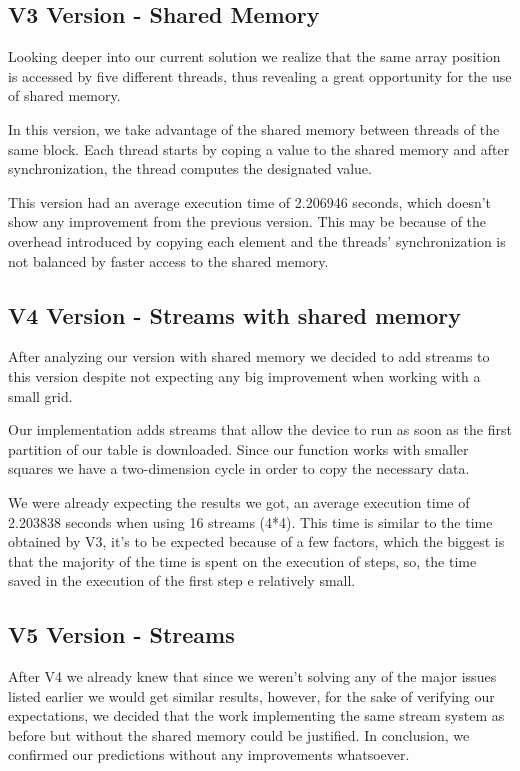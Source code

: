 \documentclass[conference]{IEEEtran}
\begin{document}


\subsection{V3 Version - Shared Memory}
Looking deeper into our current solution we realize that the same array position is accessed by five different threads, thus revealing a great opportunity for the use of shared memory.

In this version, we take advantage of the shared memory between threads of the same block. Each thread starts by coping a value to the shared memory and after synchronization, the thread computes the designated value.

This version had an average execution time of 2.206946 seconds, which doesn't show any improvement from the previous version. This may be because of the overhead introduced by copying each element and the threads' synchronization is not balanced by faster access to the shared memory.


\subsection{V4 Version - Streams with shared memory}
After analyzing our version with shared memory we decided to add streams to this version despite not expecting any big improvement when working with a small grid.

Our implementation adds streams that allow the device to run as soon as the first partition of our table is downloaded. Since our function works with smaller squares we have a two-dimension cycle in order to copy the necessary data.

We were already expecting the results we got, an average execution time of 2.203838 seconds when using 16 streams (4*4). This time is similar to the time obtained by V3, it's to be expected because of a few factors, which the biggest is that the majority of the time is spent on the execution of steps, so, the time saved in the execution of the first step e relatively small.


\subsection{V5 Version - Streams}
After V4 we already knew that since we weren't solving any of the major issues listed earlier we would get similar results, however, for the sake of verifying our expectations, we decided that the work implementing the same stream system as before but without the shared memory could be justified.
In conclusion, we confirmed our predictions without any improvements whatsoever.
\end{document}
